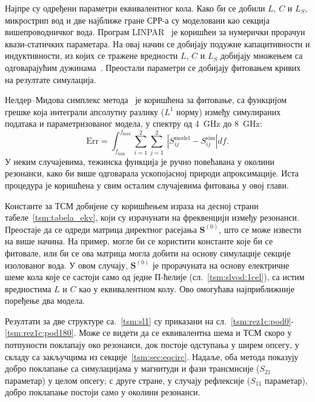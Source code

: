 Најпре су одређени параметри еквивалентног кола. Како би се добили $L$, $C$ и $L_S$, микрострип вод и две најближе гране СРР-а су моделовани као секција вишепроводничког вода. Програм LINPAR~\cite{djordjevic1999linpar} је коришћен за нумерички прорачун квази-статичких параметара. На овај начин се добијају подужне капацитивности и индуктивности, из којих се тражене вредности $L$, $C$ и $L_S$ добијају множењем са одговарајућим дужинама~\cite{radoman}. Преостали параметри се добијају фитовањем кривих на резултате симулација.

Нелдер--Мидова симплекс метода~\cite{simplex} је коришћена за фитовање, са функцијом грешке која интеграли апсолутну разлику ($L^1$ норму) између симулираних података и параметризованог модела, у спектру од \SI{4}{\giga\hertz} до \SI{8}{\giga\hertz}:
\begin{equation}
\mathrm{Err}=\int_{f_\mathrm{min}}^{f_\mathrm{max}}\sum_{i=1}^2\sum_{j=1}^2\ \left | S_{ij}^\mathrm{model} - S_{ij}^{\mathrm{sim}} \right | df.
\end{equation}
У неким случајевима, тежинска функција је ручно повећавана у околини резонанси, како би више одговарала ускопојасној природи апроксимације. Иста процедура је коришћена у свим осталим случајевима фитовања у овој глави.

Константе за ТСМ добијене су коришћењем израза на десној страни табеле~\ref{tsm:tabela_ekv}, који су израчунати на фреквенцији између резонанси. Преостаје да се одреди матрица директног расејања $\mathbf{S}^{(0)}$, што се може извести на више начина. На пример, могле би се користити константе које би се фитовале, или би се ова матрица могла добити на основу симулације секције изолованог вода. У овом случају, $\mathbf{S}^{(0)}$ је прорачуната на основу електричне шеме кола које се састоји само од једне П-ћелије (сл.~\ref{tsm:slvod:1cel}), са истим вредностима $L$ и $C$ као у еквивалентном колу. Ово омогућава најприближније поређење два модела.

Резултати за две структуре са.~\ref{tsm:sl1} су приказани на сл.~\ref{tsm:rez1c:pod0}-\ref{tsm:rez1c:pod180}. Може се видети да се еквивалентна шема и ТСМ скоро у потпуности поклапају око резонанси, док постоје одступања у ширем опсегу, у складу са закључцима из секције~\ref{tsm:sec:eqcirc}. Надаље, оба метода показују добро поклапање са симулацијама у магнитуди и фази трансмисије ($S_{21}$ параметар) у целом опсегу; с друге стране, у случају рефлексије ($S_{11}$ параметар), добро поклапање постоји само у околини резонанси.

